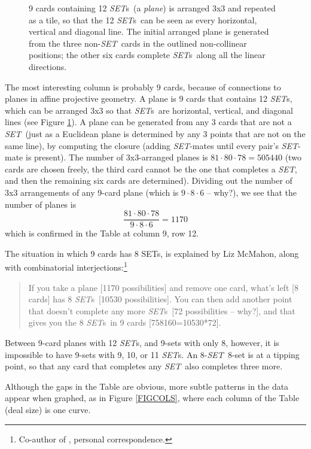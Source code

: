 \documentclass{article}
\newcommand{\SET}{{\em SET}}
\newcommand{\SETs}{{\em SET}s}
\begin{document}
\begin{figure}[!htb]
  \caption{\label{PLANE}9 cards containing 12 \SETs~(a {\em plane}) is arranged
    3x3 and repeated as a tile, so that the 12 \SETs~can be seen as every
    horizontal, vertical and diagonal line. The initial arranged plane is
    generated from the three non-\SET~cards in the outlined non-collinear
    positions; the other six cards complete \SETs~along all the linear
    directions.}
\end{figure}

The most interesting column is probably 9 cards, because of connections to
planes in affine projective geometry. A plane is 9 cards that contains 12 \SETs,
which can be arranged 3x3 so that \SETs~are horizontal, vertical, and diagonal
lines (see Figure \ref{PLANE}). A plane can be generated from any 3 cards that
are not a \SET~(just as a Euclidean plane is determined by any 3 points that are
not on the same line), by computing the closure (adding \SET-mates until every
pair's \SET-mate is present). The number of 3x3-arranged planes is $81\cdot
80\cdot 78=505440$ (two cards are chosen freely, the third card cannot be the
one that completes a \SET, and then the remaining six cards are
determined). Dividing out the number of 3x3 arrangements of any 9-card plane
(which is $9\cdot 8\cdot 6$ -- why?), we see that the number of planes is
$$\frac{81\cdot 80\cdot 78}{9\cdot 8\cdot 6} = 1170$$
which is confirmed in the Table at column 9, row 12.

The situation in which 9 cards has 8 SETs, is explained by Liz McMahon, along
with combinatorial interjections:\footnote{Co-author of \cite{JOS}, personal
correspondence.}
\begin{quote}
If you take a plane [1170 possibilities] and remove one card, what's left [8
  cards] has 8 \SETs~[10530 possibilities].  You can then add another point that
doesn't complete any more \SETs~[72 possibilities -- why?], and that gives you
the 8 \SETs~in 9 cards [758160=10530*72].
\end{quote}
Between 9-card planes with 12 \SETs, and 9-sets with only 8, however, it is
impossible to have 9-sets with 9, 10, or 11 \SETs. An 8-\SET~8-set is at a
tipping point, so that any  card that completes any \SET~also completes
three more.

Although the gaps in the Table are obvious, more subtle patterns in the data
appear when graphed, as in Figure \ref{FIGCOLS}, where each column of the Table
(deal size) is one curve.
\end{document}
